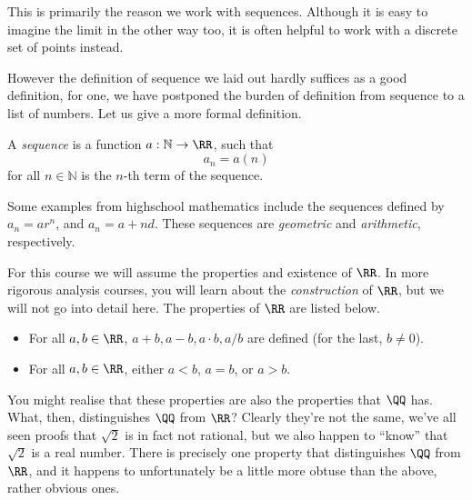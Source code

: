 This is primarily the reason we work with sequences. Although it is easy to imagine the limit
in the other way too, it is often helpful to work with a discrete set of points instead.

However the definition of sequence we laid out hardly suffices as a good definition, for one, we have postponed the burden of definition
from sequence to a list of numbers. Let us give a more formal definition.

\begin{definition}
    A \emph{sequence} is a function $a: \mathbb{N} \to \RR$, such that
    \[
        a_n = a(n)
    \]
    for all $n \in \mathbb{N}$ is the $n$-th term of the sequence.
\end{definition}


\begin{example}
    Some examples from highschool mathematics include the sequences defined by $a_n = ar^n$,
    and $a_n = a + nd$. These sequences are \emph{geometric} and \emph{arithmetic}, respectively.
\end{example}


For this course we will assume the properties and existence of $\RR$. In more rigorous analysis
courses, you will learn about the \emph{construction} of $\RR$, but we will not go into detail
here. The properties of $\RR$ are listed below.

\begin{itemize}
    \item For all $a, b \in \RR$, $a + b, a - b, a \cdot b, a / b$ are defined (for the last, $b \neq 0$).
    \item For all $a, b \in \RR$, either $a < b$, $a = b$, or $a > b$.
\end{itemize}

You might realise that these properties are also the properties that $\QQ$ has.
What, then, distinguishes $\QQ$ from $\RR$? Clearly they're not the same, we've all seen
proofs that $\sqrt{2}$ is in fact not rational, but we also happen to ``know'' that $\sqrt{2}$ is a
real number. There is precisely one property that distinguishes $\QQ$ from $\RR$, and it happens
to unfortunately be a little more obtuse than the above, rather obvious ones.

